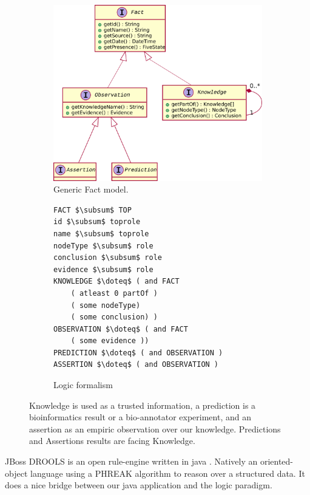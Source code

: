 \documentclass{llncs}
\newcommand{\subsum}{\mathop{\raisebox{1ex}{$\cdot$}\!\!\!\!\leq}}
\begin{document}
\begin{figure}[H]
    \centering
    \begin{subfigure}{0.6\textwidth}
    \includegraphics[width=\textwidth]{plantuml/fact.pdf}
    \caption{Generic Fact model.}
    \label{fig:fact}
    \end{subfigure}
    \hfill{}
    \begin{subfigure}{0.3\textwidth}
        \begin{lstlisting}[mathescape, basicstyle=\fontfamily{lmvtt}\selectfont]
FACT $\subsum$ TOP
id $\subsum$ toprole
name $\subsum$ toprole
nodeType $\subsum$ role
conclusion $\subsum$ role
evidence $\subsum$ role
KNOWLEDGE $\doteq$ ( and FACT
    ( atleast 0 partOf )
    ( some nodeType)
    ( some conclusion) )
OBSERVATION $\doteq$ ( and FACT
    ( some evidence ))
PREDICTION $\doteq$ ( and OBSERVATION )
ASSERTION $\doteq$ ( and OBSERVATION )
        \end{lstlisting}
    \caption{Logic formalism}
    \end{subfigure}
    \caption{Knowledge is used as a trusted information, a prediction is a bioinformatics result or a bio-annotator experiment, and an assertion as an empiric observation over our knowledge. Predictions and Assertions results are facing Knowledge.}
\end{figure}

JBoss DROOLS is an open rule-engine written in java \cite{proctor2008drools}. Natively an oriented-object language using a PHREAK algorithm \cite{phreak} to reason over a structured data. It does a nice bridge between our java application and the logic paradigm.
\end{document}
